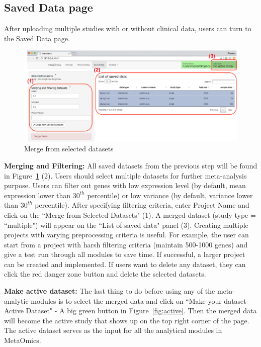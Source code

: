 \subsection{Saved Data page}
\label{sec:saved}

After uploading multiple studies with or without clinical data,
users can turn to the Saved Data page.

\begin{figure}[H]
\begin{center}
\includegraphics[scale=0.9]{./figure/preprocessing/GUImerge.pdf}
\caption{Merge from selected datasets}
\label{fig:GUImerge}
\end{center}
\end{figure}


\begin{steps}
\item \textbf{Merging and Filtering:}
All saved datasets from the previous step will be found in  Figure~\ref{fig:GUImerge} {\color{red} (2)}.
Users should select multiple datasets for further meta-analysis purpose.
Users can filter out genes with low expression level (by default, mean expression lower than $30^{th}$ percentile)
or low variance (by default, variance lower than $30^{th}$ percentile).
After specifying filtering criteria, enter Project Name and click on the ``Merge from Selected Datasets" {\color{red} (1)}.
A merged dataset (study type = ``multiple") will appear on the ``List of saved data" panel {\color{red} (3)}.
Creating multiple projects with varying preprocessing criteria is useful.
For example, the user can start from a project with harsh filtering criteria (maintain 500-1000 genes) and give a test run through all modules to save time.
If successful, a larger project can be created and implemented.
If users want to delete any dataset, they can click the red danger zone button and delete the selected datasets.

\item \textbf{Make active dataset:}
\label{sec:active}
The last thing to do before using any of the meta-analytic modules is to select the merged data and click on 
``Make your dataset Active Dataset" - A big green button in Figure~\ref{fig:active}.
Then the merged data will become the active study that shows up on the top right corner of the page.
The active dataset serves as the input for all the analytical modules in MetaOmics.

\end{steps}







